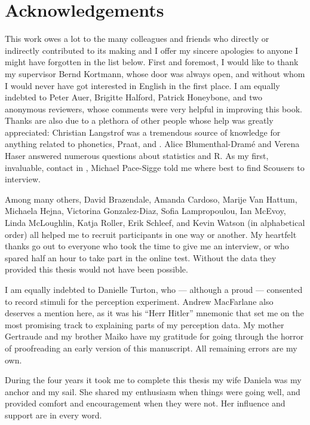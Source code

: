 \chapter*{Acknowledgements}

This work owes a lot to the many colleagues and friends who directly or indirectly contributed to its making and I offer my sincere apologies to anyone I might have forgotten in the list below.
First and foremost, I would like to thank my supervisor Bernd Kortmann, whose door was always open, and without whom I would never have got interested in  English in the first place.
I am equally indebted to Peter Auer, Brigitte Halford, Patrick Honeybone, and two anonymous reviewers, whose comments were very helpful in improving this book.
Thanks are also due to a plethora of other people whose help was greatly appreciated:
Christian Langstrof was a tremendous source of knowledge for anything related to phonetics, Praat, and  .
Alice Blumenthal-Dramé and Verena Haser answered numerous questions about statistics and R.
As my first, invaluable, contact in , Michael Pace-Sigge told me where best to find Scousers to interview.

Among many others, David Brazendale, Amanda Cardoso, Marije Van Hattum, Michaela Hejna, Victorina Gonzalez-Diaz, Sofia Lampropoulou, Ian McEvoy, Linda McLoughlin, Katja Roller, Erik Schleef, and Kevin Watson (in alphabetical order) all helped me to recruit participants in one way or another.
My heartfelt thanks go out to everyone who took the time to give me an interview, or who spared half an hour to take part in the online test.
Without the data they provided this thesis would not have been possible.

I am equally indebted to Danielle Turton, who --- although a proud  --- consented to record   stimuli for the perception experiment.
Andrew MacFarlane also deserves a mention here, as it was his ``Herr Hitler'' mnemonic that set me on the most promising track to explaining parts of my perception data.
My mother Gertraude and my brother Maiko have my gratitude for going through the horror of proofreading an early version of this manuscript.
All remaining errors are my own.

During the four years it took me to complete this thesis my wife Daniela was my anchor and my sail.
She shared my enthusiasm when things were going well, and provided comfort and encouragement when they were not.
Her influence and support are in every word.